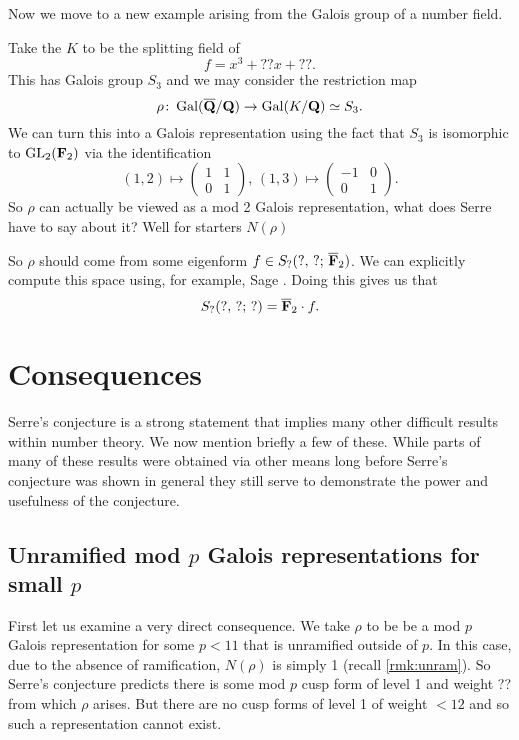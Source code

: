 \documentclass[a4paper,12pt]{article}
\begin{document}
Now we move to a new example arising from the Galois group of a number field.

\begin{ex}
Take the $K$ to be the splitting field of
\[
f = x^3 + ??x + ??.
\]
This has Galois group $S_3$ and we may consider the restriction map
\[
\rho\colon \operatorname{Gal}(\overline{\mathbf{Q}}/\mathbf{Q}) \to \operatorname{Gal}(K/\mathbf{Q}) \simeq S_3.
\]
We can turn this into a Galois representation using the fact that $S_3$ is isomorphic to $\operatorname{GL}_2(\mathbf{F}_2)$ via the identification %
\[
(1, 2) \mapsto \begin{pmatrix} 1 & 1 \\ 0 & 1 \end{pmatrix},\,
(1, 3) \mapsto \begin{pmatrix} -1 & 0 \\ 0 & 1 \end{pmatrix}.
\]
So $\rho$ can actually be viewed as a mod 2 Galois representation, what does Serre have to say about it?
Well for starters $N(\rho)$

So $\rho$ should come from some eigenform $f \in S_?(?,\,?;\,\overline{\mathbf{F}}_2)$.
We can explicitly compute this space using, for example, Sage \cite{Sage}.
Doing this gives us that
\[
S_?(?,\,?;\,?) = \overline{\mathbf{F}}_2 \cdot f.
\]

\end{ex}


\section{Consequences}
Serre's conjecture is a strong statement that implies many other difficult results within number theory.
We now mention briefly a few of these.
While parts of many of these results were obtained via other means long before Serre's conjecture was shown in general they still serve to demonstrate the power and usefulness of the conjecture.


\subsection{Unramified mod $p$ Galois representations for small $p$}
First let us examine a very direct consequence. %
We take $\rho$ to be be a mod $p$ Galois representation for some $p < 11$ that is unramified outside of $p$.
In this case, due to the absence of ramification, $N(\rho)$ is simply 1 (recall \cref{rmk:unram}). %
So Serre's conjecture predicts there is some mod $p$ cusp form of level 1 and weight ?? from which $\rho$ arises.
But there are no cusp forms of level 1 of weight $< 12$ and so such a representation cannot exist.
\end{document}
